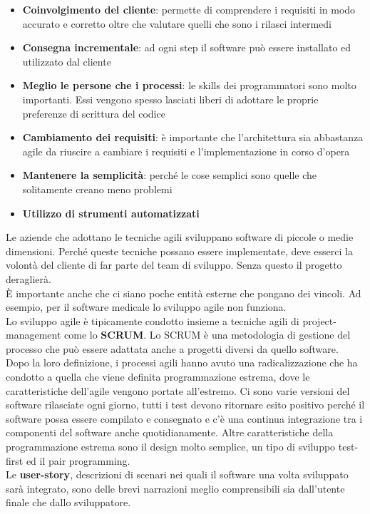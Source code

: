 \begin{itemize}[noitemsep]
    \item \textbf{Coinvolgimento del cliente}: permette di comprendere i requisiti in modo accurato e corretto oltre che valutare quelli che sono i rilasci intermedi
    \item \textbf{Consegna incrementale}: ad ogni step il software può essere installato ed utilizzato dal cliente
    \item \textbf{Meglio le persone che i processi}: le skills dei programmatori sono molto importanti. Essi vengono spesso lasciati liberi di adottare le proprie preferenze di scrittura del codice
    \item \textbf{Cambiamento dei requisiti}: è importante che l'architettura sia abbastanza agile da riuscire a cambiare i requisiti e l'implementazione in corso d'opera
    \item \textbf{Mantenere la semplicità}: perché le cose semplici sono quelle che solitamente creano meno problemi
    \item \textbf{Utilizzo di strumenti automatizzati}
\end{itemize}
Le aziende che adottano le tecniche agili sviluppano software di piccole o medie dimensioni.
Perché queste tecniche possano essere implementate, deve esserci la volontà del cliente di far parte del team di sviluppo.
Senza questo il progetto deraglierà.\\
È importante anche che ci siano poche entità esterne che pongano dei vincoli.
Ad esempio, per il software medicale lo sviluppo agile non funziona.\\
Lo sviluppo agile è tipicamente condotto insieme a tecniche agili di project-management come lo \textbf{SCRUM}.
Lo SCRUM è una metodologia di gestione del processo che può essere adattata anche a progetti diversi da quello software.\\
Dopo la loro definizione, i processi agili hanno avuto una radicalizzazione che ha condotto a quella che viene definita programmazione estrema, dove le caratteristiche dell'agile vengono portate all'estremo.
Ci sono varie versioni del software rilasciate ogni giorno, tutti i test devono ritornare esito positivo perché il software possa essere compilato e consegnato e c'è una continua integrazione tra i componenti del software anche quotidianamente.
Altre caratteristiche della programmazione estrema sono il design molto semplice, un tipo di sviluppo test-first ed il pair programming.\\
Le \textbf{user-story}, descrizioni di scenari nei quali il software una volta sviluppato sarà integrato, sono delle brevi narrazioni meglio comprensibili sia dall'utente finale che dallo sviluppatore.\\
